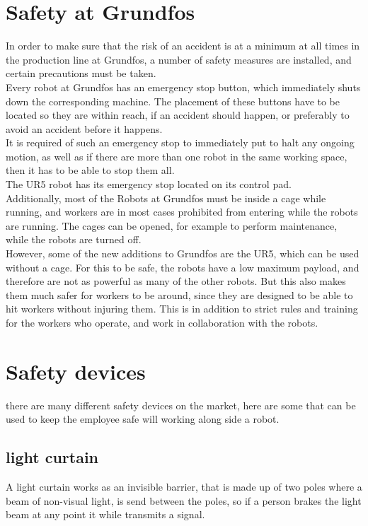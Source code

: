 \section{Safety at Grundfos}\label{ch:Safety at Grundfos}
In order to make sure that the risk of an accident is at a minimum at all times in the production line at Grundfos, a number of safety measures are installed, and certain precautions must be taken.\\

Every robot at Grundfos has an emergency stop button, which immediately shuts down the corresponding machine. The placement of these buttons have to be located so they are within reach, if an accident should happen, or preferably to avoid an accident before it happens. \\
It is required of such an emergency stop to immediately put to halt any ongoing motion, as well as if there are more than one robot in the same working space, then it has to be able to stop them all.\\
The UR5 robot has its emergency stop located on its control pad.\\

Additionally, most of the Robots at Grundfos must be inside a cage while running, and workers are in most cases prohibited from entering while the robots are running. The cages can be opened, for example to perform maintenance, while the robots are turned off.\\

However, some of the new additions to Grundfos are the UR5, which can be used without a cage. For this to be safe, the robots have a low maximum payload, and therefore are not as powerful as many of the other robots. But this also makes them much safer for workers to be around, since they are designed to be able to hit workers without injuring them. This is in addition to strict rules and training for the workers who operate, and work in collaboration with the robots. \\

\section{Safety devices}\label{SafetyDevices}
there are many different safety devices  on the market, here are some that can be used to keep the employee safe will working along side a robot.\\

\subsection{light curtain}
A light curtain works as an invisible barrier, that is made up of two poles where a beam of non-visual light, is send between the poles, so if a person brakes the light beam at any point it while transmits a signal\cite{ligthcurtian}.\\

